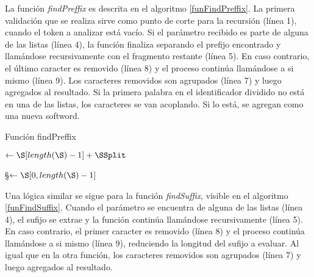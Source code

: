 La función \textit{findPreffix} es descrita en el algoritmo \ref{funFindPreffix}. 
La primera validación que se realiza sirve como punto de corte para la recursión (línea 1), cuando el token a analizar está vacío.
Si el parámetro recibido es parte de alguna de las listas (línea 4), la función finaliza separando el prefijo encontrado y llamándose recursivamente con el fragmento restante (línea 5).
En caso contrario, el último caracter es removido (línea 8) y el proceso continúa llamándose a si mismo (línea 9).
Los caracteres removidos son agrupados (línea 7) y luego agregados al resultado. 
Si la primera palabra en el identificador dividido no está en una de las listas, los caracteres se van acoplando. Si lo está, se agregan como una nueva softword.

\begin{algorithm}
\caption{Función findPreffix}
\label{funFindPreffix}
\DontPrintSemicolon
  
  
  
  \BlankLine
  
  \BlankLine
  
  \BlankLine
  \SSplit $\leftarrow \S[length(\S) - 1] + \SSplit$\;
  
  \BlankLine
  \S $\leftarrow \S[0, length(\S) - 1]$\;
  
  \BlankLine
  \KwRet \FindPreffixSSSplit
\end{algorithm}

Una lógica similar se sigue para la función \textit{findSuffix}, visible en el algoritmo \ref{funFindSuffix}. 
Cuando el parámetro se encuentra de alguna de las listas (línea 4), el sufijo se extrae y la función continúa llamándose recursivamente (línea 5).
En caso contrario, el primer caracter es removido (línea 8) y el proceso continúa llamándose a si mismo (línea 9), reduciendo la longitud del sufijo a evaluar.
Al igual que en la otra función, los caracteres removidos son agrupados (línea 7) y luego agregados al resultado.

